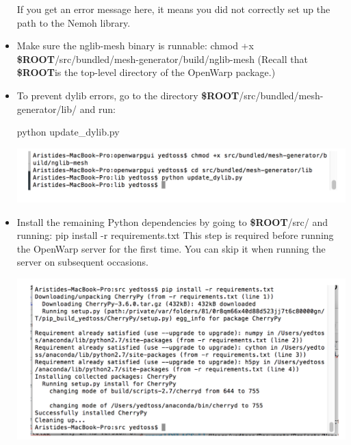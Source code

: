 \documentclass[12pt]{article}
\newcommand{\ROOT}{{\textbf{\$ROOT}}}
\begin{document}
\begin{itemize}
						If you get an error message here, it means you did not correctly set up the path to the Nemoh library.
						
						
						\item Make sure the nglib-mesh binary is runnable:
						{\color{blue}chmod +x \ROOT/src/bundled/mesh-generator/build/nglib-mesh} 
						(Recall that \ROOT is the top-level directory of the OpenWarp package.)
						
						\item To prevent dylib errors, go to the directory \ROOT/src/bundled/mesh-generator/lib/ and run:
						
							{\color{blue}python update{\_}dylib.py}
							
								\vspace{\abovedisplayskip}
								\begin{minipage}{\linewidth}
									\centering
									\includegraphics[scale=0.75]{img/17}
								\end{minipage}
							\vspace{\belowdisplayskip}
							
						\item
						Install the remaining Python dependencies by going to \ROOT/src/ and running:
						{\color{blue}pip install -r requirements.txt}
						This step is required before running the OpenWarp server for the first time. You can skip it when running the server on subsequent occasions.
						
							\vspace{\abovedisplayskip}
							\begin{minipage}{\linewidth}
								\centering
								\includegraphics[scale=0.75]{img/18}
							\end{minipage}
							\vspace{\belowdisplayskip}
							

\end{itemize}
\end{document}
